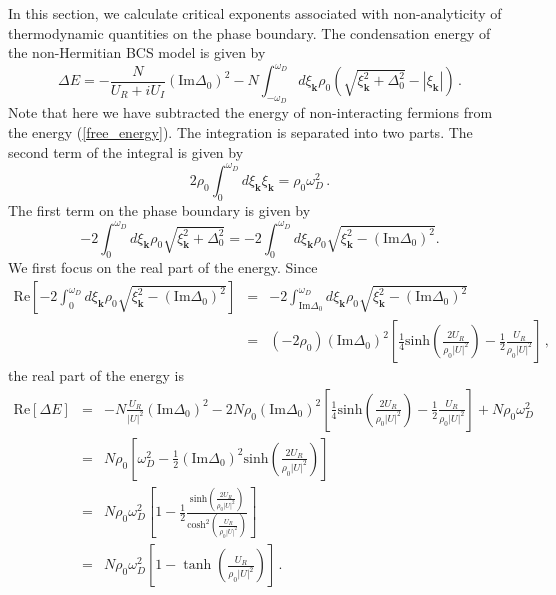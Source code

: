\documentclass[aps,onecolumn,superscriptaddress,notitlepage,longbibliography]{revtex4-1}
\begin{document}
In this section, we calculate critical exponents associated with non-analyticity of thermodynamic quantities on the phase boundary. The condensation energy of the non-Hermitian BCS model is given by \cite{Yamamoto2019}
\begin{equation}
 \Delta E = - \frac{N}{U_R + i U_I} \left( \text{Im} \Delta_0 \right)^2
  - N \int_{- \omega_D}^{\omega_D} d \xi_{\bm{k}} \rho_0 \left( \sqrt{\xi_{\bm{k}}^2 +
  \Delta_0^2} - | \xi_{\bm{k}} | \right)\,.\label{free_energy}
\end{equation}
Note that here we have subtracted the energy of non-interacting fermions from the energy (\ref{free_energy}). The integration is separated into two parts. The second term of the integral is given by
\begin{equation}
  2 \rho_0 \int_0^{\omega_D} d \xi_{\bm{k}} \xi_{\bm{k}} = \rho_0 \omega_D^2\,.
\end{equation}
The first term on the phase boundary is given by
\[ - 2 \int_0^{\omega_D} d \xi_{\bm{k}} \rho_0 \sqrt{\xi_{\bm{k}}^2 + \Delta_0^2} = - 2
   \int_0^{\omega_D} d \xi_{\bm{k}} \rho_0 \sqrt{\xi_{\bm{k}}^2 - \left( \text{Im} \Delta_0
   \right)^2}. \]
We first focus on the real part of the energy. Since
\begin{eqnarray}
  \text{Re}\left[- 2 \int_0^{\omega_D} d \xi_{\bm{k}} \rho_0 \sqrt{\xi_{\bm{k}}^2 - \left( \text{Im}
  \Delta_0 \right)^2}\right] & = & - 2 \int_{\text{Im} \Delta_0}^{\omega_D}
  d \xi_{\bm{k}} \rho_0 \sqrt{\xi_{\bm{k}}^2 - \left( \text{Im} \Delta_0 \right)^2}
  \nonumber\\
  & = & (- 2 \rho_0) \left( \text{Im} \Delta_0 \right)^2 \left[ \frac{1}{4}
  \text{sinh} \left( \frac{2 U_R}{\rho_0 | U |^2} \right) - \frac{1}{2}
  \frac{U_R}{\rho_0 | U |^2} \right]\,,
\end{eqnarray}
the real part of the energy is
\begin{eqnarray}
  \text{Re} [\Delta E] & = & - N \frac{U_R}{| U |^2} \left( \text{Im} \Delta_0
  \right)^2 - 2 N \rho_0 \left( \text{Im} \Delta_0 \right)^2 \left[
  \frac{1}{4} \text{sinh} \left( \frac{2 U_R}{\rho_0 | U |^2} \right) -
  \frac{1}{2} \frac{U_R}{\rho_0 | U |^2} \right] + N \rho_0 \omega_D^2
  \nonumber\\
  & = & N \rho_0 \left[ \omega_D^2 - \frac{1}{2} \left( \text{Im} \Delta_0
  \right)^2 \text{sinh} \left( \frac{2 U_R}{\rho_0 | U |^2} \right) \right]
  \nonumber\\
  & = & N \rho_0 \omega_D^2 \left[ 1 - \frac{1}{2} \frac{\text{sinh} \left(
  \frac{2 U_R}{\rho_0 | U |^2} \right)}{\text{cosh}^2 \left( \frac{U_R}{\rho_0
  | U |^2} \right)} \right]\nonumber\\
  & = & N \rho_0 \omega_D^2 \left[ 1-\tanh\left(
	\frac{U_R}{\rho_0 | U |^2} \right)\right]\,.
  \label{free}
\end{eqnarray}
\end{document}
